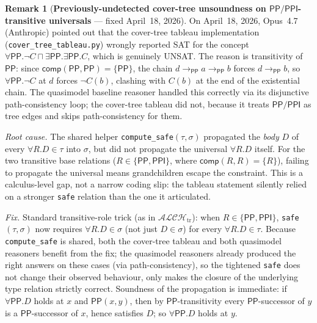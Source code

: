 \documentclass[
]{ceurart}
\theoremstyle{definition}
\newtheorem{remark}[theorem]{Remark}
\newcommand{\PP}{\ensuremath{\mathsf{PP}}}
\newcommand{\PPI}{\ensuremath{\mathsf{PPI}}}
\newcommand{\comp}{\ensuremath{\mathsf{comp}}}
\begin{document}
\begin{remark}[\textbf{Previously-undetected cover-tree unsoundness on $\PP/\PPI$-transitive universals} --- fixed April~18, 2026]
\label{rem:ct-trans-bug}
On April~18, 2026, Opus~4.7 (Anthropic) pointed out that the
cover-tree tableau implementation
(\texttt{cover\_tree\_tableau.py}) wrongly reported SAT for the
concept $\forall \PP. \neg C \sqcap \exists \PP. \exists \PP. C$,
which is genuinely UNSAT. The reason is transitivity of $\PP$:
since $\comp(\PP, \PP) = \{\PP\}$, the chain $d \to_\PP a
\to_\PP b$ forces $d \to_\PP b$, so $\forall \PP. \neg C$ at $d$
forces $\neg C(b)$, clashing with $C(b)$ at the end of the
existential chain. The quasimodel baseline reasoner handled this
correctly via its disjunctive path-consistency loop; the
cover-tree tableau did not, because it treats $\PP/\PPI$ as tree
edges and skips path-consistency for them.

\emph{Root cause.} The shared helper \texttt{compute\_safe}$(\tau,
\sigma)$ propagated the \emph{body} $D$ of every
$\forall R.D \in \tau$ into $\sigma$, but did not propagate the
universal $\forall R.D$ itself. For the two transitive base
relations ($R \in \{\PP, \PPI\}$, where $\comp(R, R) = \{R\}$),
failing to propagate the universal means grandchildren escape the
constraint. This is a calculus-level gap, not a narrow coding
slip: the tableau statement silently relied on a stronger
\texttt{safe} relation than the one it articulated.

\emph{Fix.} Standard transitive-role trick (as in
$\mathcal{ALCH}_{\mathrm{tr}}$): when $R \in \{\PP, \PPI\}$,
\texttt{safe}$(\tau, \sigma)$ now requires
$\forall R. D \in \sigma$ (not just $D \in \sigma$) for every
$\forall R. D \in \tau$. Because \texttt{compute\_safe} is
shared, both the cover-tree tableau and both quasimodel reasoners
benefit from the fix; the quasimodel reasoners already produced
the right answers on these cases (via path-consistency), so the
tightened \texttt{safe} does not change their observed behaviour,
only makes the closure of the underlying type relation strictly
correct. Soundness of the propagation is immediate: if
$\forall \PP. D$ holds at $x$ and $\PP(x, y)$, then by
$\PP$-transitivity every $\PP$-successor of $y$ is a
$\PP$-successor of $x$, hence satisfies $D$; so $\forall \PP. D$
holds at $y$.


\end{remark}
\end{document}
